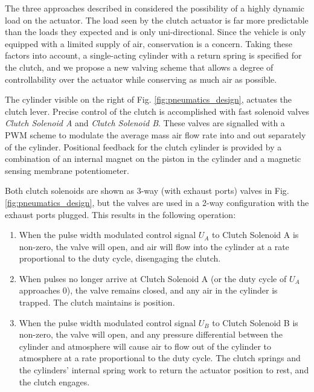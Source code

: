 The three approaches described in \cite{pneumatic_actuator, adaptive_pneumatic, accurate_position} considered the possibility of a highly dynamic load on the actuator. The load seen by the clutch actuator is far more predictable than the loads they expected and is only uni-directional. Since the vehicle is only equipped with a limited supply of air, conservation is a concern. Taking these factors into account, a single-acting cylinder with a return spring is specified for the clutch, and we propose a new valving scheme that allows a degree of controllability over the actuator while conserving as much air as possible.

The cylinder visible on the right of Fig. \ref{fig:pneumatics_design}, actuates the clutch lever. Precise control of the clutch is accomplished with fast solenoid valves \emph{Clutch Solenoid A} and \emph{Clutch Solenoid B}. These valves are signalled with a PWM scheme to modulate the average mass air flow rate into and out separately of the cylinder. Positional feedback for the clutch cylinder is provided by a combination of an internal magnet on the piston in the cylinder and a magnetic sensing membrane potentiometer.

Both clutch solenoids are shown as 3-way (with exhaust ports) valves in Fig. \ref{fig:pneumatics_design}, but the valves are used in a 2-way configuration with the exhaust ports plugged.  This results in the following operation:

\begin{enumerate}
  \item When the pulse width modulated control signal $U_A$ to Clutch Solenoid A is non-zero, the valve will open, and air will flow into the cylinder at a rate proportional to the duty cycle, disengaging the clutch.
  \item When pulses no longer arrive at Clutch Solenoid A (or the duty cycle of $U_A$ approaches 0), the valve remains closed, and any air in the cylinder is trapped. The clutch maintains is position.
  \item When the pulse width modulated control signal $U_B$ to Clutch Solenoid B is non-zero, the valve will open, and any pressure differential between the cylinder and atmosphere will cause air to flow out of the cylinder to atmosphere at a rate proportional to the duty cycle. The clutch springs and the cylinders' internal spring work to return the actuator position to rest, and the clutch engages.
\end{enumerate}

